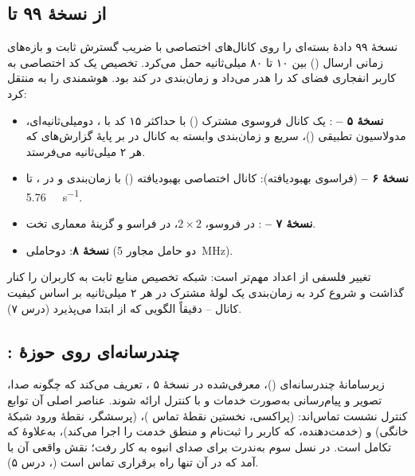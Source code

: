 \documentclass[11pt,a4paper]{article}
\begin{document}
\subsection{از نسخهٔ ۹۹ تا }
نسخهٔ ۹۹ دادهٔ بسته‌ای را روی کانال‌های اختصاصی با ضریب گسترش ثابت و بازه‌های زمانی ارسال
() بین ۱۰ تا ۸۰ میلی‌ثانیه حمل می‌کرد. تخصیص یک کد اختصاصی به کاربر انفجاری فضای کد را
هدر می‌داد و زمان‌بندی در  کند بود.  هوشمندی را به  منتقل کرد:
\begin{itemize}
  \item \textbf{نسخهٔ ۵ -- } \cite{ts25308}: یک کانال فروسوی مشترک () با حداکثر
        ۱۵ کد با ،  دومیلی‌ثانیه‌ای، مدولاسیون تطبیقی ()، 
        سریع و زمان‌بندی وابسته به کانال در  بر پایهٔ گزارش‌های  که  هر
        ۲ میلی‌ثانیه می‌فرستد.
  \item \textbf{نسخهٔ ۶ -- } (فراسوی بهبودیافته): کانال اختصاصی بهبودیافته ()
        با زمان‌بندی و  در ، تا \qty{5.76}{\mega\bit\per\second}.
  \item \textbf{نسخهٔ ۷ -- }:  در فروسو،  $2\times2$،  در فراسو و
        گزینهٔ معماری تخت.
  \item \textbf{نسخهٔ ۸}:  دوحاملی (دو حامل مجاور \qty{5}{\mega\hertz}).
\end{itemize}
تغییر فلسفی از اعداد مهم‌تر است: شبکه تخصیص منابع ثابت به کاربران را کنار گذاشت و شروع کرد به
زمان‌بندی یک لولهٔ مشترک در هر ۲ میلی‌ثانیه بر اساس کیفیت کانال -- دقیقاً الگویی که  از
ابتدا می‌پذیرد (درس ۷).

\subsection{: چندرسانه‌ای  روی حوزهٔ }
زیرسامانهٔ چندرسانه‌ای  ()، معرفی‌شده در نسخهٔ ۵ \cite{ts23228}، تعریف می‌کند
که چگونه صدا، تصویر و پیام‌رسانی به‌صورت خدمات  و با کنترل  \cite{rfc3261}
ارائه شوند. عناصر اصلی آن توابع کنترل نشست تماس‌اند: \textbf{} (پراکسی، نخستین نقطهٔ
تماس )، \textbf{} (پرسشگر، نقطهٔ ورود شبکهٔ خانگی) و \textbf{}
(خدمت‌دهنده، که کاربر را ثبت‌نام و منطق خدمت را اجرا می‌کند)، به‌علاوهٔ  که تکامل 
است. در نسل سوم  به‌ندرت برای صدای انبوه به کار رفت؛ نقش واقعی آن با  آمد که
در آن تنها راه برقراری تماس است (، درس ۵).
\end{document}
